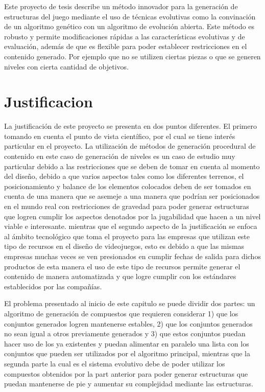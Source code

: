 Este proyecto de tesis describe un método innovador para la generación de
estructuras del juego mediante el uso de técnicas evolutivas como la convinación
de un algoritmo genético con un algoritmo de evolución abierta. Este método es
robusto y permite modificaciones rápidas a las características evolutivas y de
evaluación, además de que es flexible para poder establecer restricciones en el
contenido generado. Por ejemplo que no se utilizen ciertas piezas o que se
generen niveles con cierta cantidad de objetivos.

\section{Justificacion}
\label{section:justification}

La justificación de este proyecto se presenta en dos puntos diferentes. El primero
tomando en cuenta el punto de vista científico, por el cual se tiene interés
particular en el proyecto. La utilización de métodos de generación procedural de
contenido en este caso de generación de niveles es un caso de estudio muy
particular debido a las restricciones que se deben de tomar en cuenta al momento
del diseño, debido a que varios aspectos tales como los diferentes terrenos, el
posicionamiento y balance de los elementos colocados deben de ser tomados en
cuenta de una manera que se asemeje a una manera que podrían ser posicionados en
el mundo real con restricciones de gravedad para poder generar estructuras que
logren cumplir los aspectos denotados por la jugabilidad que hacen a un nivel
viable e interesante. 
mientras que el segundo aspecto de la justificación se
enfoca al ámbito tecnológico que toma el proyecto para las empresas que utilizan
este tipo de recursos en el diseño de videojuegos, esto es debido a que las
mismas empresas muchas veces se ven presionados en cumplir fechas de salida para
dichos productos de esta manera el uso de este tipo de recursos permite generar
el contenido de manera automatizada y que logre cumplir con los estándares
establecidos por las compañías.


El problema presentado al inicio de este capitulo se puede dividir dos partes:
un algoritmo de generación de compuestos que requieren considerar 1) que los
conjuntos generados logren mantenerse estables, 2) que los conjuntos generados
no sean igual a otros previamente generados y 3) que estos conjuntos puedan
hacer uso de los ya existentes y puedan alimentar en paralelo una lista con los
conjuntos que pueden ser utilizados por el algoritmo principal, mientras que la
segunda parte la cual es el sistema evolutivo debe de poder utilizar los
compuestos obtenidos por la part anterior para poder generar estructuras que
puedan mantenerse de pie y aumentar su complejidad mediante las estructuras.


